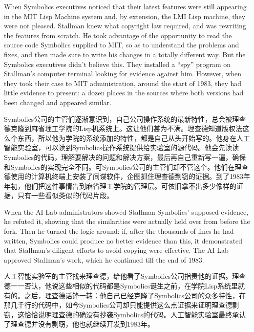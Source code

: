 \ifdefined\eng
When Symbolics executives noticed that their latest features were still appearing in the MIT Lisp Machine system and, by extension, the LMI Lisp machine, they were not pleased. Stallman knew what copyright law required, and was rewriting the features from scratch.  He took advantage of the opportunity to read the source code Symbolics supplied to MIT, so as to understand the problems and fixes, and then made sure to write his changes in a totally different way.  But the Symbolics executives didn't believe this.  They installed a ``spy'' program on Stallman's computer terminal looking for evidence against him.  However, when they took their case to MIT administration, around the start of 1983, they had little evidence to present: a dozen places in the sources where both versions had been changed and appeared similar.
\fi

\ifdefined\chs
Symbolics公司的主管们逐渐意识到，自己公司操作系统的最新特性，总会被理查德克隆到麻省理工学院的Lisp机系统上。这让他们甚为不满。理查德知道版权法这么个东西，所以他为学院的系统添加的特性，都是自己从头开始写的。他身在人工智能实验室，可以读到Symbolics操作系统提供给实验室的源代码。他会先读读Symbolics的代码，理解要解决的问题和解决方案，最后再自己重新写一遍，确保和Symbolics的实现完全不同。可Symbolics公司的主管们却不管这个。他们在理查德使用的计算机终端上安装了间谍软件，企图抓住理查德剽窃的证据。到了1983年年初，他们把这件事情告到麻省理工学院的管理层。可依旧拿不出多少像样的证据，只有一些看似类似的代码片段。
\fi

\ifdefined\eng
When the AI Lab administrators showed Stallman Symbolics' supposed evidence, he refuted it, showing that the similarities were actually held over from before the fork.  Then he turned the logic around: if, after the thousands of lines he had written, Symbolics could produce no better evidence than this, it demonstrated that Stallman's diligent efforts to avoid copying were effective.  The AI Lab approved Stallman's work, which he continued till the end of 1983.
\fi

\ifdefined\chs
人工智能实验室的主管找来理查德，给他看了Symbolics公司指责他的证据。理查德一一否认，他说这些相似的代码都是Symbolics诞生之前，在学院Lisp系统里就有的。之后，理查德话锋一转：他自己已经克隆了Symbolics公司的众多特性，在那几千行的代码中，如今Symbolics公司却只能提供这么点证据来证明理查德剽窃，这恰恰说明理查德的确没有抄袭Symbolics的代码。人工智能实验室最终承认了理查德并没有剽窃，他也就继续开发到1983年。
\fi

